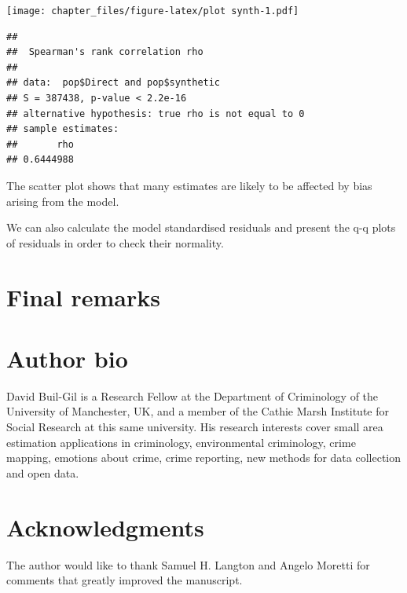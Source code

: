\documentclass[
]{article}
\newenvironment{Shaded}{\begin{snugshade}}{\end{snugshade}}
\newcommand{\CommentTok}[1]{\textcolor[rgb]{0.56,0.35,0.01}{\textit{#1}}}
\newcommand{\DataTypeTok}[1]{\textcolor[rgb]{0.13,0.29,0.53}{#1}}
\newcommand{\KeywordTok}[1]{\textcolor[rgb]{0.13,0.29,0.53}{\textbf{#1}}}
\newcommand{\NormalTok}[1]{#1}
\newcommand{\OperatorTok}[1]{\textcolor[rgb]{0.81,0.36,0.00}{\textbf{#1}}}
\newcommand{\StringTok}[1]{\textcolor[rgb]{0.31,0.60,0.02}{#1}}
\begin{document}
\texttt{[image: chapter\_files/figure-latex/plot synth-1.pdf]}

\begin{Shaded}
\end{Shaded}

\begin{verbatim}
## 
##  Spearman's rank correlation rho
## 
## data:  pop$Direct and pop$synthetic
## S = 387438, p-value < 2.2e-16
## alternative hypothesis: true rho is not equal to 0
## sample estimates:
##       rho 
## 0.6444988
\end{verbatim}

The scatter plot shows that many estimates are likely to be affected by
bias arising from the model.

We can also calculate the model standardised residuals and present the
q-q plots of residuals in order to check their normality.

\hypertarget{final-remarks}{%
\section{Final remarks}\label{final-remarks}}

\hypertarget{author-bio}{%
\section{Author bio}\label{author-bio}}

David Buil-Gil is a Research Fellow at the Department of Criminology of
the University of Manchester, UK, and a member of the Cathie Marsh
Institute for Social Research at this same university. His research
interests cover small area estimation applications in criminology,
environmental criminology, crime mapping, emotions about crime, crime
reporting, new methods for data collection and open data.

\hypertarget{acknowledgments}{%
\section{Acknowledgments}\label{acknowledgments}}

The author would like to thank Samuel H. Langton and Angelo Moretti for
comments that greatly improved the manuscript.
\end{document}

